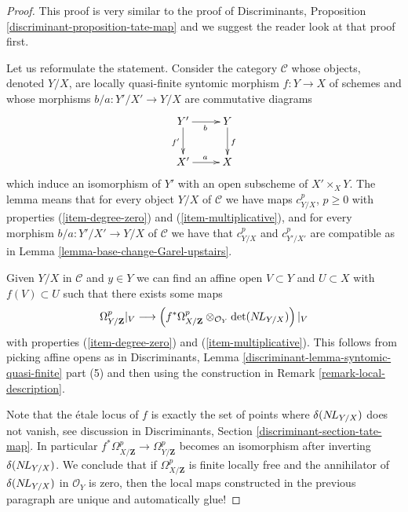 \begin{proof}
This proof is very similar to the proof of
Discriminants, Proposition \ref{discriminant-proposition-tate-map}
and we suggest the reader look at that proof first.

\medskip\noindent
Let us reformulate the statement. Consider the category
$\mathcal{C}$ whose objects, denoted $Y/X$, are locally quasi-finite syntomic
morphism $f : Y \to X$ of schemes and whose morphisms
$b/a : Y'/X' \to Y/X$ are commutative diagrams
$$
\xymatrix{
Y' \ar[d]_{f'} \ar[r]_b & Y \ar[d]^f \\
X' \ar[r]^a & X
}
$$
which induce an isomorphism of $Y'$ with an open subscheme of
$X' \times_X Y$. The lemma means that for every object
$Y/X$ of $\mathcal{C}$ we have maps $c^p_{Y/X}$, $p \geq 0$
with properties (\ref{item-degree-zero}) and (\ref{item-multiplicative}),
and for every morphism $b/a : Y'/X' \to Y/X$ of $\mathcal{C}$ we have
that $c^p_{Y/X}$ and $c^p_{Y'/X'}$ are compatible as in
Lemma \ref{lemma-base-change-Garel-upstairs}.

\medskip\noindent
Given $Y/X$ in $\mathcal{C}$ and $y \in Y$ we can find
an affine open $V \subset Y$ and $U \subset X$ with $f(V) \subset U$
such that there exists some maps
$$
\Omega^p_{Y/\mathbf{Z}}|_V
\longrightarrow
\left(
f^*\Omega^p_{X/\mathbf{Z}} \otimes_{\mathcal{O}_Y} \det(\mathop{N\!L}\nolimits_{Y/X})
\right)|_V
$$
with properties (\ref{item-degree-zero}) and (\ref{item-multiplicative}).
This follows from picking affine opens as in
Discriminants, Lemma \ref{discriminant-lemma-syntomic-quasi-finite} part (5)
and then using the construction in Remark \ref{remark-local-description}.

\medskip\noindent
Note that the \'etale locus of $f$ is exactly the set of points where
$\delta(\mathop{N\!L}\nolimits_{Y/X})$ does not vanish, see discussion in
Discriminants, Section \ref{discriminant-section-tate-map}.
In particular
$f^*\Omega^p_{X/\mathbf{Z}} \to \Omega^p_{Y/\mathbf{Z}}$
becomes an isomorphism after inverting $\delta(\mathop{N\!L}\nolimits_{Y/X})$.
We conclude that if $\Omega^p_{X/\mathbf{Z}}$ is finite locally free and
the annihilator of $\delta(\mathop{N\!L}\nolimits_{Y/X})$ in $\mathcal{O}_Y$ is zero, then
the local maps constructed in the previous paragraph
are unique and automatically glue!


\end{proof}
